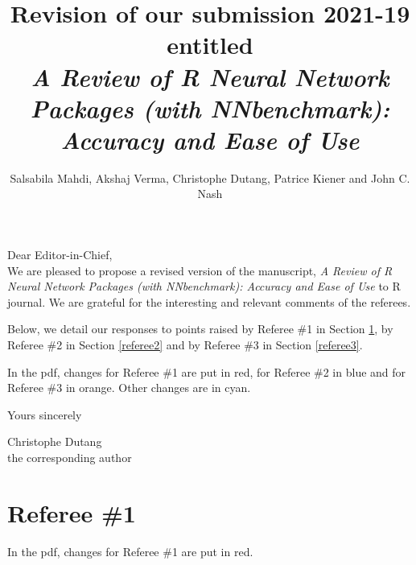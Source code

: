 \documentclass[12pt]{article}
\title{Revision of our submission 2021-19 entitled\\ \textsl{A Review of R Neural Network Packages (with NNbenchmark): Accuracy and Ease of Use}}
\author{Salsabila Mahdi, Akshaj Verma, Christophe Dutang, Patrice Kiener and John C. Nash}
\newcommand{\orange}[1]{{\color{orange}#1}}
\newcommand{\cyan}[1]{{\color{cyan}#1}}
\newcommand{\red}[1]{{\color{red}#1}}
\newcommand{\blue}[1]{{\color{blue}#1}}
\begin{document}
\maketitle

Dear Editor-in-Chief,\\

\noindent We are pleased to propose a revised version of the manuscript, 
\textsl{A Review of R Neural Network Packages (with NNbenchmark): Accuracy and Ease of Use} to R journal. 
We are grateful for the interesting and relevant comments of the referees.

\medskip
Below, we detail our responses to points raised by Referee \#1 in Section \ref{referee1},
by Referee \#2 in Section \ref{referee2} and by Referee \#3 in Section \ref{referee3}.
\medskip

In the pdf, changes for Referee  \#1 are put in \red{red}, for Referee \#2 in \blue{blue} and
for Referee  \#3 in \orange{orange}.  Other changes are in \cyan{cyan}.

Yours sincerely
\bigskip


Christophe Dutang\\
the corresponding author

 
\newpage
\section{Referee \#1}\label{referee1}

In the pdf, changes for Referee  \#1 are put in \red{red}.  
\end{document}
